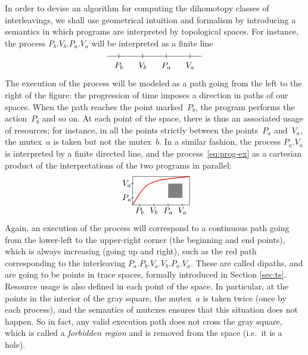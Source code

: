 \documentclass[orivec]{llncs} \usepackage[T1]{fontenc}
\newcommand{\ie}{i.e.~}
\renewcommand{\P}[1]{P_{#1}}
\newcommand{\V}[1]{V_{#1}}
\begin{document}
{In order to devise an algorithm for computing the dihomotopy classes of
interleavings, we shall use geometrical intuition and formalism by introducing a
semantics in which programs are interpreted by topological spaces. For instance,
the process $\P b.\V b.\P a.\V a$ will be interpreted as a finite line
\[
\begin{tikzpicture}
  \draw (0,0) -- (4,0);
  \foreach \x in {0,1,2,3} \draw (\x+.5,-1mm) -- (\x+.5,1mm);
  \draw (.5,-4mm) node {$\P b$};
  \draw (1.5,-4mm) node {$\V b$};
  \draw (2.5,-4mm) node {$\P a$};
  \draw (3.5,-4mm) node {$\V a$};
\end{tikzpicture}
\]
The execution of the process will be modeled as a path going from the left to
the right of the figure: the progression of time imposes a direction in paths of
our spaces. When the path reaches the point marked~$\P b$, the program performs
the action~$\P b$ and so on. At each point of the space, there is thus an
associated usage of resources; for instance, in all the points strictly between
the points~$\P a$ and~$\V a$, the mutex~$a$ is taken but not the mutex~$b$. In a
similar fashion, the process $\P a.\V a$ is interpreted by a finite directed
line, and the process~\eqref{eq:prog-ex} as a cartesian product of the
interpretations of the two programs in parallel:
\begin{equation}
  \label{eq:ts-prog-ex}
\begin{tikzpicture}[scale=0.6]
  \draw[line width=0.3mm,color=red] (0,0) .. controls (1,1.7) .. (4,2);
  \draw (0,0) -- (0,2) -- (4,2) -- (4,0) -- cycle;
  \fill[fill=gray] (2.5,.5) -- (2.5,1.5) -- (3.5,1.5) -- (3.5,.5) -- cycle;
  \foreach \x in {0,1} \draw (-1mm,\x+.5) -- (1mm,\x+.5);
  \foreach \x in {0,1,2,3} \draw (\x+.5,-1mm) -- (\x+.5,1mm);
  \draw (.5,-4mm) node {$\P b$};
  \draw (1.5,-4mm) node {$\V b$};
  \draw (2.5,-4mm) node {$\P a$};
  \draw (3.5,-4mm) node {$\V a$};
  \draw (-4mm,.5) node {$\P a$};
  \draw (-4mm,1.5) node {$\V a$};
\end{tikzpicture}
\end{equation}
Again, an execution of the process will correspond to a continuous path going
from the lower-left to the upper-right corner (the beginning and end points),
which is always increasing (going up and right), such as the red path
corresponding to the interleaving $\P a.\P b.\V a.\V b.\P a.\V a$. These are
called dipaths, and are going to be points in trace spaces, formally introduced
in Section \ref{sec:ts}.  Resource usage is also defined in each point of the
space. In particular, at the points in the interior of the gray square, the
mutex~$a$ is taken twice (once by each process), and the semantics of mutexes
ensures that this situation does not happen. So in fact, any valid execution
path does not cross the gray square, which is called a \emph{forbidden region}
and is removed from the space (\ie it is a hole).

}
\end{document}

